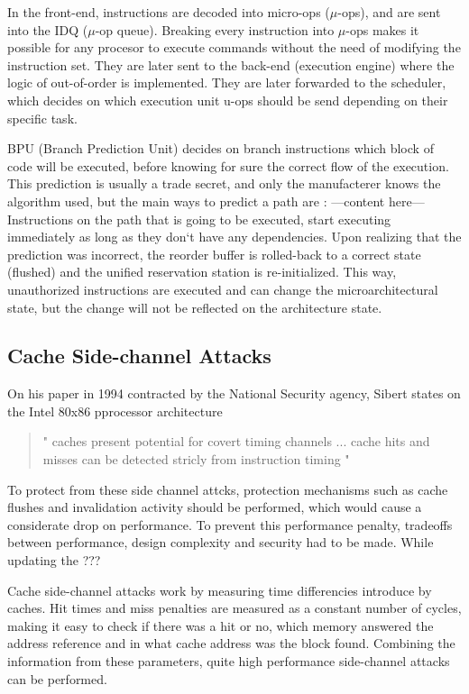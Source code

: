 \documentclass[sigconf]{acmart}
\begin{document}
In the front-end, instructions are decoded into micro-ops ($\mu$-ops), and are sent into the IDQ ($\mu$-op queue). Breaking every instruction into $\mu$-ops makes it possible for any procesor to execute commands without the need of modifying the instruction set. They are later sent to the back-end (execution engine) where the logic of out-of-order is implemented. They are later forwarded to the scheduler, which decides on which execution unit u-ops should be send depending on their specific task. 

BPU (Branch Prediction Unit) decides on branch instructions which block of code will be executed, before knowing for sure the correct flow of the execution. This prediction is usually a trade secret, and only the manufacterer knows the algorithm used, but the main ways to predict a path are : ---content here--- Instructions on the path that is going to be executed, start executing immediately as long as they don‘t have any dependencies. Upon realizing that the prediction was incorrect, the reorder buffer is rolled-back to a correct state (flushed) and the unified reservation station is re-initialized. This way, unauthorized instructions are executed and can change the microarchitectural state, but the change will not be reflected on the architecture state. 


\subsection{Cache Side-channel Attacks}
On his paper in 1994 contracted by the National Security agency, Sibert \cite{} states on the Intel 80x86 pprocessor architecture 
\begin{quote}
" caches present potential for covert timing channels ... cache hits and misses can be detected stricly from instruction timing "  
\end{quote}

To protect from these side channel attcks, protection mechanisms such as cache flushes and invalidation activity should be performed, which would cause a considerate drop on performance. To prevent this performance penalty, tradeoffs between performance, design complexity and security had to be made. While updating the ???

Cache side-channel attacks work by measuring time differencies introduce by caches. Hit times and miss penalties are measured as a constant number of cycles, making it easy to check if there was a hit or no, which memory answered the address reference and in what cache address was the block found. Combining the information from these parameters, quite high performance side-channel attacks can be performed.  
\end{document}
